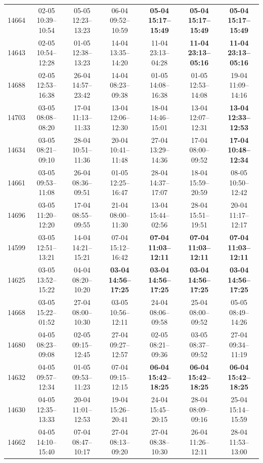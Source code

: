 \begin{table}[htbp]
\begin{tabular}{|r|c|c|c|c|c|c|}
14664 & 02-05 10:39--10:54 & 05-05 12:23--13:23 & 06-04 09:52--10:59 & \textbf{05-04 15:17--15:49} & \textbf{05-04 15:17--15:49} & \textbf{05-04 15:17--15:49} \\ 
14643 & 02-05 10:54--12:28 & 01-05 12:38--13:23 & 14-04 13:35--14:20 & 11-04 23:13--04:28 & \textbf{11-04 23:13--05:16} & \textbf{11-04 23:13--05:16} \\ 
14688 & 02-05 12:53--16:38 & 26-04 14:57--23:42 & 14-04 08:23--09:38 & 01-05 14:08--16:38 & 01-05 12:53--14:08 & 19-04 11:09--14:16 \\ 
14703 & 03-05 08:08--08:20 & 17-04 11:13--11:33 & 13-04 12:06--12:30 & 18-04 14:46--15:01 & 13-04 12:07--12:31 & \textbf{13-04 12:33--12:53} \\ 
14634 & 03-05 08:21--09:10 & 28-04 10:51--11:36 & 20-04 10:41--11:48 & 27-04 13:29--14:36 & 17-04 08:00--09:52 & \textbf{17-04 10:48--12:34} \\ 
14661 & 03-05 09:53--11:08 & 26-04 08:36--09:51 & 01-05 12:25--16:47 & 28-04 14:37--17:07 & 18-04 15:59--20:59 & 08-05 10:50--12:42 \\ 
14696 & 03-05 11:20--12:20 & 17-04 08:55--09:55 & 21-04 08:00--11:30 & 13-04 15:44--02:56 & 28-04 15:51--19:51 & 20-04 11:17--12:17 \\ 
14599 & 03-05 12:51--13:21 & 14-04 14:21--15:21 & 07-04 15:12--16:42 & \textbf{07-04 11:03--12:11} & \textbf{07-04 11:03--12:11} & \textbf{07-04 11:03--12:11} \\ 
14625 & 03-05 13:52--15:22 & 04-04 08:20--10:20 & \textbf{03-04 14:56--17:25} & \textbf{03-04 14:56--17:25} & \textbf{03-04 14:56--17:25} & \textbf{03-04 14:56--17:25} \\ 
14668 & 03-05 15:22--01:52 & 27-04 08:00--10:30 & 03-05 10:56--12:11 & 24-04 08:06--09:58 & 25-04 08:00--09:52 & 05-05 08:49--14:26 \\ 
14680 & 04-05 08:23--09:08 & 02-05 09:15--12:45 & 27-04 09:27--12:57 & 02-05 08:21--09:36 & 03-05 08:37--09:52 & 27-04 09:34--11:19 \\ 
14632 & 04-05 09:57--12:34 & 01-05 09:53--11:23 & 07-04 09:15--12:15 & \textbf{06-04 15:42--18:25} & \textbf{06-04 15:42--18:25} & \textbf{06-04 15:42--18:25} \\ 
14630 & 04-05 12:35--13:33 & 20-04 11:01--12:53 & 19-04 15:26--20:41 & 24-04 15:45--20:15 & 28-04 08:09--09:16 & 25-04 15:14--15:59 \\ 
14662 & 04-05 14:10--15:40 & 07-04 08:47--10:17 & 27-04 08:13--09:20 & 27-04 08:38--10:30 & 26-04 11:26--12:11 & 28-04 11:53--13:00 \\ 

\end{tabular}
\end{table}
